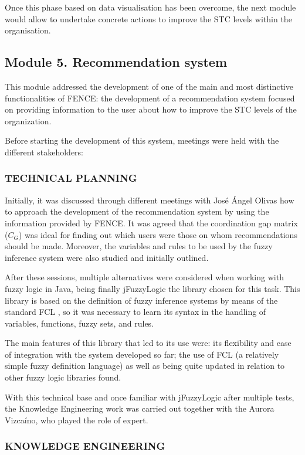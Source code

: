 Once this phase based on data visualisation has been overcome, the next module would allow to undertake concrete actions to improve the STC levels within the organisation.

\subsection{Module 5. Recommendation system}

This module addressed the development of one of the main and most distinctive functionalities of FENCE: the development of a recommendation system focused on providing information to the user about how to improve the STC levels of the organization.

Before starting the development of this system, meetings were held with the different stakeholders:

\subsubsection{TECHNICAL PLANNING}
Initially, it was discussed through different meetings with José Ángel Olivas how to approach the development of the recommendation system by using the information provided by FENCE. It was agreed that the coordination gap matrix ($C_G$) was ideal for finding out which users were those on whom recommendations should be made. Moreover, the variables and rules to be used by the fuzzy inference system were also studied and initially outlined.

After these sessions, multiple alternatives were considered when working with fuzzy logic in Java, being finally jFuzzyLogic \cite{cingolani_jfuzzylogic_2012, cingolani_jfuzzylogic_2013} the library chosen for this task. This library is based on the definition of fuzzy inference systems by means of the standard FCL \cite{FCL}, so it was necessary to learn its syntax in the handling of variables, functions, fuzzy sets, and rules.

The main features of this library that led to its use were: its flexibility and ease of integration with the system developed so far; the use of FCL (a relatively simple fuzzy definition language) as well as being quite updated in relation to other fuzzy logic libraries found.

With this technical base and once familiar with jFuzzyLogic after multiple tests, the Knowledge Engineering work was carried out together with the Aurora Vizcaíno, who played the role of expert.

\subsubsection{KNOWLEDGE ENGINEERING}

